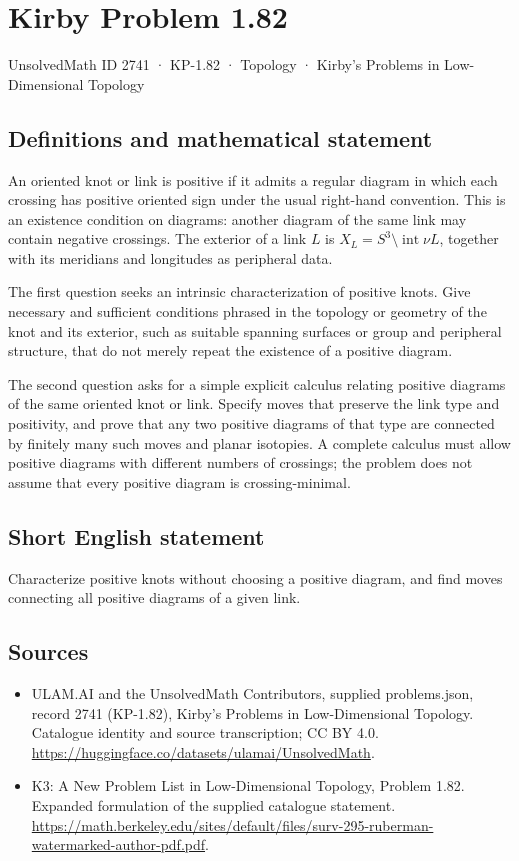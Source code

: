 \documentclass[11pt,a4paper]{article}
\begin{document}
\section*{Kirby Problem 1.82}\label{2741}
{\small UnsolvedMath ID 2741 · KP-1.82 · Topology · Kirby's Problems in Low-Dimensional Topology}
\subsection{Definitions and mathematical statement}
An oriented knot or link is positive if it admits a regular diagram in which
each crossing has positive oriented sign under the usual right-hand convention.
This is an existence condition on diagrams: another diagram of the same link
may contain negative crossings. The exterior of a link $L$ is
$X_L=S^3\setminus\operatorname{int}\nu L$, together with its meridians and
longitudes as peripheral data.

The first question seeks an intrinsic characterization of positive knots.
Give necessary and sufficient conditions phrased in the topology or geometry
of the knot and its exterior, such as suitable spanning surfaces or group and
peripheral structure, that do not merely repeat the existence of a positive
diagram.

The second question asks for a simple explicit calculus relating positive
diagrams of the same oriented knot or link. Specify moves that preserve the
link type and positivity, and prove that any two positive diagrams of that
type are connected by finitely many such moves and planar isotopies. A complete
calculus must allow positive diagrams with different numbers of crossings;
the problem does not assume that every positive diagram is crossing-minimal.
\subsection{Short English statement}
Characterize positive knots without choosing a positive diagram, and find moves connecting all positive diagrams of a given link.
\subsection{Sources}
\begin{itemize}
\item[S1] ULAM.AI and the UnsolvedMath Contributors, supplied problems.json, record 2741 (KP-1.82), Kirby's Problems in Low-Dimensional Topology. Catalogue identity and source transcription; CC BY 4.0.
\url{https://huggingface.co/datasets/ulamai/UnsolvedMath}.
\item[S2] K3: A New Problem List in Low-Dimensional Topology, Problem 1.82. Expanded formulation of the supplied catalogue statement.
\url{https://math.berkeley.edu/sites/default/files/surv-295-ruberman-watermarked-author-pdf.pdf}.
\end{itemize}
\end{document}
